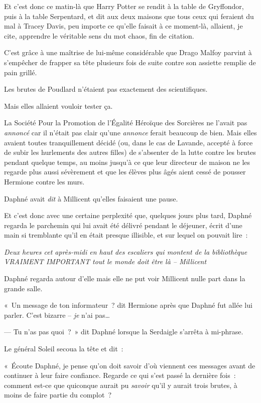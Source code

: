 \later

Et c'est donc ce matin-là que Harry Potter se rendit à la table de Gryffondor, puis à la table Serpentard, et dit aux deux maisons que tous ceux qui feraient du mal à Tracey Davis, peu importe ce qu'elle faisait à ce moment-là, allaient, je cite, apprendre le véritable sens du mot chaos, fin de citation.

C'est grâce à une maîtrise de lui-même considérable que Drago Malfoy parvint à s'empêcher de frapper sa tête plusieurs fois de suite contre son assiette remplie de pain grillé.

Les brutes de Poudlard n'étaient pas exactement des scientifiques.

Mais elles allaient vouloir tester ça.

\later

La Société Pour la Promotion de l'Égalité Héroïque des Sorcières ne l'avait pas \emph{annoncé} car il n'était pas clair qu'une \emph{annonce} ferait beaucoup de bien.
Mais elles avaient toutes tranquillement décidé (ou, dans le cas de Lavande, accepté à force de subir les hurlements des autres filles) de s'absenter de la lutte contre les brutes pendant quelque temps, au moins jusqu'à ce que leur directeur de maison ne les regarde plus aussi sévèrement et que les élèves plus âgés aient cessé de pousser Hermione contre les murs.

Daphné avait \emph{dit} à Millicent qu'elles faisaient une pause.

Et c'est donc avec une certaine perplexité que, quelques jours plus tard, Daphné regarda le parchemin qui lui avait été délivré pendant le déjeuner, écrit d'une main si tremblante qu'il en était presque illisible, et sur lequel on pouvait lire~:

\emph{Deux heures cet après-midi en haut des escaliers qui montent de la bibliothèque VRAIMENT IMPORTANT tout le monde doit être là -- Millicent}

Daphné regarda autour d'elle mais elle ne put voir Millicent nulle part dans la grande salle.

«~Un message de ton informateur~? dit Hermione après que Daphné fut allée lui parler.
C'est bizarre -- \emph{je} n'ai pas…

--- Tu n'as pas quoi~?~»
dit Daphné lorsque la Serdaigle s'arrêta à mi-phrase.

Le général Soleil secoua la tête et dit~:

«~Écoute Daphné, je pense qu'on doit savoir d'où viennent ces messages avant de continuer à leur faire confiance.
Regarde ce qui s'est passé la dernière fois~: comment est-ce que quiconque aurait pu \emph{savoir} qu'il y aurait trois brutes, à moins de faire partie du complot~?

